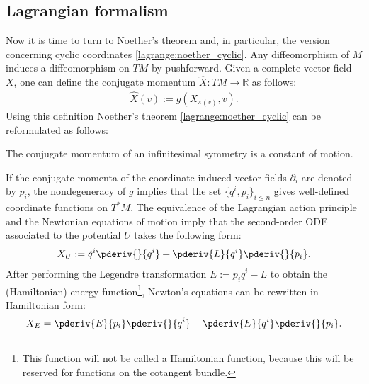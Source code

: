 \subsection{Lagrangian formalism}

    Now it is time to turn to Noether's theorem and, in particular, the version concerning cyclic coordinates \ref{lagrange:noether_cyclic}. Any diffeomorphism of $M$ induces a diffeomorphism on $TM$ by pushforward.
    Given a complete vector field $X$, one can define the conjugate momentum $\widehat{X}:TM\rightarrow\mathbb{R}$ as follows:
    \begin{gather}
        \label{lagrange:metric_conjugate_momentum}
        \widehat{X}(v) := g(X_{\pi(v)},v).
    \end{gather}
    Using this definition Noether's theorem \ref{lagrange:noether_cyclic} can be reformulated as follows:
    \begin{theorem}
        The conjugate momentum of an infinitesimal symmetry is a constant of motion.
    \end{theorem}

    If the conjugate momenta of the coordinate-induced vector fields $\partial_i$ are denoted by $p_i$, the nondegeneracy of $g$ implies that the set $\{q^i,p_i\}_{i\leq n}$ gives well-defined coordinate functions on $T^*M$. The equivalence of the Lagrangian action principle and the Newtonian equations of motion imply that the second-order ODE associated to the potential $U$ takes the following form:
    \begin{gather}
        X_U := \dot{q}^i\pderiv{}{q^i} + \pderiv{L}{q^i}\pderiv{}{p_i}.
    \end{gather}
    After performing the Legendre transformation $E:=p_i\dot{q}^i-L$ to obtain the (Hamiltonian) energy function\footnote{This function will not be called a Hamiltonian function, because this will be reserved for functions on the cotangent bundle.}, Newton's equations can be rewritten in Hamiltonian form:
    \begin{gather}
        X_E = \pderiv{E}{p_i}\pderiv{}{q^i}-\pderiv{E}{q^i}\pderiv{}{p_i}.
    \end{gather}

